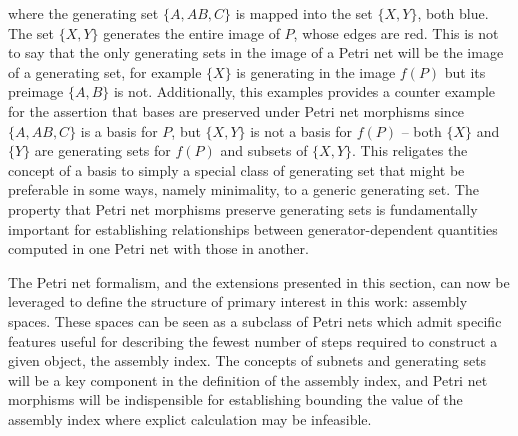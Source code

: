 \documentclass[aps,prd,onecolumn,nofootinbib,letterpaper,preprintnumbers,superscriptaddress,eqsecnum]{revtex4}
\theoremstyle{definition}
\begin{document}
\begin{center}
{
    }
\end{center}
where the generating set $\{A, AB, C\}$ is mapped into the set $\{X, Y\}$, both blue.
The set $\{X, Y\}$ generates the entire image of $P$, whose edges are red.
This is not to say that the only generating sets in the image of a Petri net will be the image of a generating set, for example $\{X\}$ is generating in the image $f(P)$ but its preimage $\{A,B\}$ is not.
Additionally, this examples provides a counter example for the assertion that bases are preserved under Petri net morphisms since $\{A, AB, C\}$ is a basis for $P$, but $\{X, Y\}$ is not a basis for $f(P)$ -- both $\{X\}$ and $\{Y\}$ are generating sets for $f(P)$ and subsets of $\{X, Y\}$.
This religates the concept of a basis to simply a special class of generating set that might be preferable in some ways, namely minimality, to a generic generating set.
The property that Petri net morphisms preserve generating sets is fundamentally important for establishing relationships between generator-dependent quantities computed in one Petri net with those in another.

The Petri net formalism, and the extensions presented in this section, can now be leveraged to define the structure of primary interest in this work: assembly spaces.
These spaces can be seen as a subclass of Petri nets which admit specific features useful for describing the fewest number of steps required to construct a given object, the assembly index.
The concepts of subnets and generating sets will be a key component in the definition of the assembly index, and Petri net morphisms will be indispensible for establishing bounding the value of the assembly index where explict calculation may be infeasible.
\end{document}
